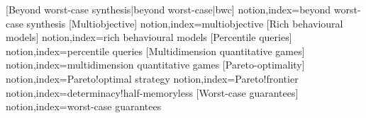   [Beyond worst-case synthesis|beyond worst-case|bwc]
  {notion,index={beyond worst-case synthesis}}
  [Multiobjective]
  {notion,index={multiobjective}}
  [Rich behavioural models]
  {notion,index={rich behavioural models}}
  [Percentile queries]
  {notion,index={percentile queries}}
  [Multidimension quantitative games]
  {notion,index={multidimension quantitative games}}
  [Pareto-optimality]
  {notion,index={Pareto!optimal strategy}}
  {notion,index={Pareto!frontier}}
  {notion,index={determinacy!half-memoryless}}
  [Worst-case guarantees]
  {notion,index={worst-case guarantees}}